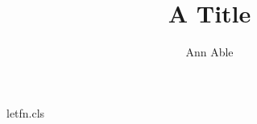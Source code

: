 \begin{filecontents*}[overwrite]{letfn.cls}
\newcommand\corr[1]{\expandafter\gdef\csname nc@corr\endcsname{#1}}
\let\thanks\footnote
\renewcommand\maketitle{\par\begingroup\centering{\Large\@title\par}%
  {\@author\thanks{Corresponding author: \csname nc@corr\endcsname}\par}\endgroup}
\end{filecontents*}
\documentclass{letfn}

\title{A Title}
\author{Ann Able}
\maketitle
Text.

